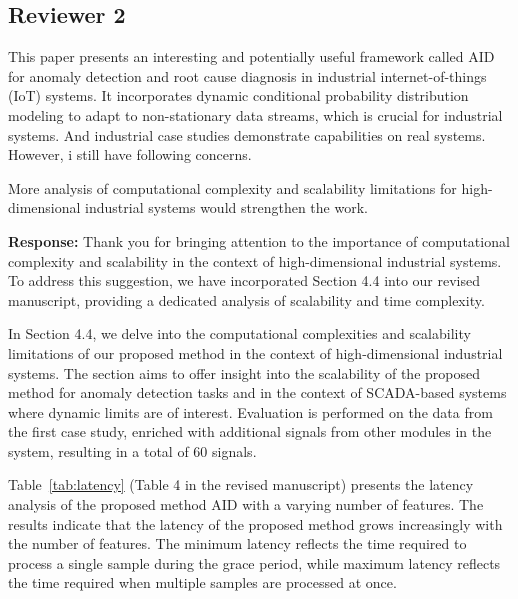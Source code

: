 \documentclass{article}
\makeatletter
\newenvironment{comment}{
\begin{sloppypar}\slshape
\vspace{5 mm}
\color{blue}
 \@beginparpenalty\@M
  \begin{list}{}{\setlength{\topsep}{0ex}%
  \setlength{\leftmargin}{\rightmargin}}\item[]
 \@beginparpenalty\@endparpenalty
}
{\end{list}
\end{sloppypar}
}
\makeatother
\begin{document}
\subsection*{Reviewer 2}
\begin{comment}
This paper presents an interesting and potentially useful framework called AID for anomaly detection and root cause diagnosis in industrial internet-of-things (IoT) systems. It incorporates dynamic conditional probability distribution modeling to adapt to non-stationary data streams, which is crucial for industrial systems. And industrial case studies demonstrate capabilities on real systems. However, i still have following concerns.
\end{comment}

\begin{enumerate}
  \item
        \begin{comment}
        More analysis of computational complexity and scalability limitations for high-dimensional industrial systems would strengthen the work.
        \end{comment}
        {\bf Response:}
        Thank you for bringing attention to the importance of computational complexity and scalability in the context of high-dimensional industrial systems. To address this suggestion, we have incorporated Section 4.4 into our revised manuscript, providing a dedicated analysis of scalability and time complexity.

        In Section 4.4, we delve into the computational complexities and scalability limitations of our proposed method in the context of high-dimensional industrial systems. The section aims to offer insight into the scalability of the proposed method for anomaly detection tasks and in the context of SCADA-based systems where dynamic limits are of interest. Evaluation is performed on the data from the first case study, enriched with additional signals from other modules in the system, resulting in a total of 60 signals.

        Table~\ref{tab:latency} (Table 4 in the revised manuscript) presents the latency analysis of the proposed method AID with a varying number of features. The results indicate that the latency of the proposed method grows increasingly with the number of features. The minimum latency reflects the time required to process a single sample during the grace period, while maximum latency reflects the time required when multiple samples are processed at once.


\end{enumerate}
\end{document}
